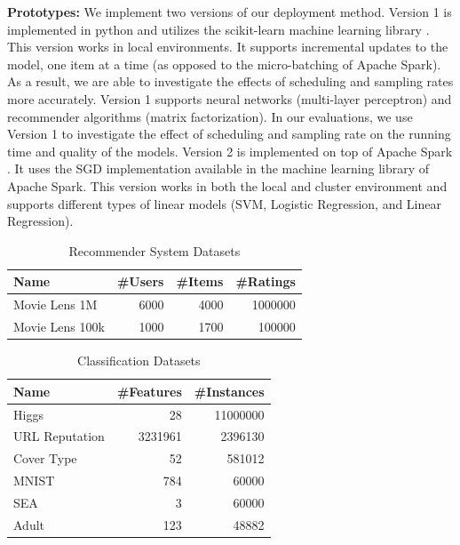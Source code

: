 \documentclass[10pt,conference,letterpaper]{IEEEtran}
\begin{document}
\textbf{Prototypes:} We implement two versions of our deployment method.
Version 1 is implemented in python and utilizes the scikit-learn machine learning library \cite{sklearn_api}.
This version works in local environments.
It supports incremental updates to the model, one item at a time (as opposed to the micro-batching of Apache Spark).
As a result, we are able to investigate the effects of scheduling and sampling rates more accurately.
Version 1 supports neural networks (multi-layer perceptron) and recommender algorithms (matrix factorization).
In our evaluations, we use Version 1 to investigate the effect of scheduling and sampling rate on the running time and quality of the models.
Version 2 is implemented on top of Apache Spark \cite{zaharia2010spark}.
It uses the SGD implementation available in the machine learning library of Apache Spark.
This version works in both the local and cluster environment and supports different types of linear models (SVM, Logistic Regression, and Linear Regression).

\begin{table}\centering
\begin{tabular}{lrrr}
 \toprule
Name & \#Users & \#Items & \#Ratings
\\\midrule 
Movie Lens 1M  & 6000 & 4000 & 1000000 \\
Movie Lens 100k & 1000 & 1700 & 100000 
\\\bottomrule 
\end{tabular}
\caption{Recommender System Datasets}
\label{table:recommender-systems}
\end{table}

\begin{table}\centering
\begin{tabular}{lrr}
 \toprule
Name & \#Features  & \#Instances 
\\\midrule 
Higgs  & 28 & 11000000 \\
URL Reputation & 3231961 & 2396130 \\
Cover Type & 52 & 581012 \\
MNIST & 784 & 60000 \\
SEA & 3 & 60000 \\
Adult & 123 & 48882
\\\bottomrule 
\end{tabular}
\caption{Classification Datasets}
\end{table}
\end{document}
